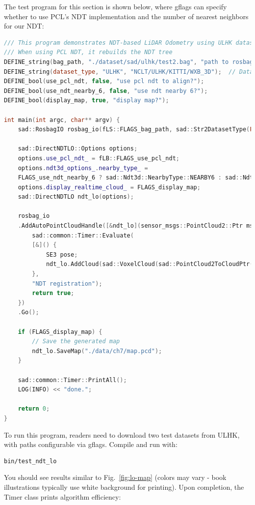 The test program for this section is shown below, where gflags can specify whether to use PCL's NDT implementation and the number of nearest neighbors for our NDT:

\begin{lstlisting}[language=c++,caption=src/ch7/test/test_ndt_lo.cc]
/// This program demonstrates NDT-based LiDAR Odometry using ULHK dataset
/// When using PCL NDT, it rebuilds the NDT tree
DEFINE_string(bag_path, "./dataset/sad/ulhk/test2.bag", "path to rosbag");
DEFINE_string(dataset_type, "ULHK", "NCLT/ULHK/KITTI/WXB_3D");  // Dataset type
DEFINE_bool(use_pcl_ndt, false, "use pcl ndt to align?");
DEFINE_bool(use_ndt_nearby_6, false, "use ndt nearby 6?");
DEFINE_bool(display_map, true, "display map?");

int main(int argc, char** argv) {
	sad::RosbagIO rosbag_io(fLS::FLAGS_bag_path, sad::Str2DatasetType(FLAGS_dataset_type));
	
	sad::DirectNDTLO::Options options;
	options.use_pcl_ndt_ = fLB::FLAGS_use_pcl_ndt;
	options.ndt3d_options_.nearby_type_ =
	FLAGS_use_ndt_nearby_6 ? sad::Ndt3d::NearbyType::NEARBY6 : sad::Ndt3d::NearbyType::CENTER;
	options.display_realtime_cloud_ = FLAGS_display_map;
	sad::DirectNDTLO ndt_lo(options);
	
	rosbag_io
	.AddAutoPointCloudHandle([&ndt_lo](sensor_msgs::PointCloud2::Ptr msg) -> bool {
		sad::common::Timer::Evaluate(
		[&]() {
			SE3 pose;
			ndt_lo.AddCloud(sad::VoxelCloud(sad::PointCloud2ToCloudPtr(msg)), pose);
		},
		"NDT registration");
		return true;
	})
	.Go();
	
	if (FLAGS_display_map) {
		// Save the generated map
		ndt_lo.SaveMap("./data/ch7/map.pcd");
	}
	
	sad::common::Timer::PrintAll();
	LOG(INFO) << "done.";
	
	return 0;
}
\end{lstlisting}

To run this program, readers need to download two test datasets from ULHK, with paths configurable via gflags. Compile and run with:

\begin{lstlisting}[language=sh,caption=Terminal command:]
bin/test_ndt_lo 
\end{lstlisting}

You should see results similar to Fig.~\ref{fig:lo-map} (colors may vary - book illustrations typically use white background for printing). Upon completion, the Timer class prints algorithm efficiency:

